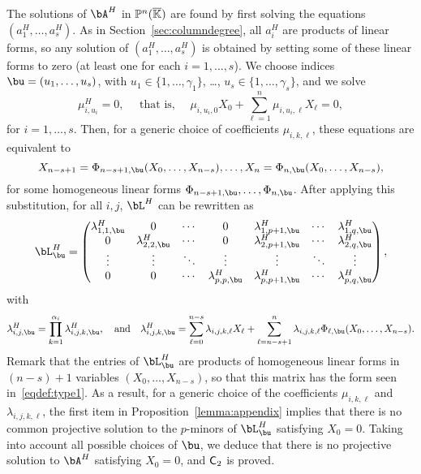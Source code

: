 \documentclass[12pt]{article}
\begin{document}
The solutions of $\bA^H$ in $\mathbb{P}^n(\overline{\mathbb{K}})$ are found by first solving
the equations $(a^H_1,\dots,a^H_s)$. As in Section~\ref{sec:columndegree}, all
$a_i^H$ are products of linear forms, so any solution of
$(a^H_1,\dots,a^H_s)$ is obtained by setting some of these linear forms
to zero (at least one for each $i=1,\dots,s$). We choose indices $\bu=(u_1,\dots,u_s)$, with
$u_1\in\{1,\dots,\gamma_1\}$, \dots, $u_s\in\{1,\dots,\gamma_s\}$, and
we solve
$$\mu^H_{i,u_i}=0, \quad \text{~that is,~} \quad \mu_{i,u_i,0}X_0 + \sum_{\ell = 1}^{n}\mu_{i,u_i,\ell}X_\ell =0,$$ for $i=1,\dots,s$.
Then, for a generic choice of coefficients $\mu_{i,k,\ell}$, these equations
are equivalent to
$$X_{n-s+1}=\Phi_{n-s+1,\bu}(X_0,\dots,X_{n-s}),\dots,X_{n}=\Phi_{n,\bu}(X_0,\dots,X_{n-s}),$$
for some homogeneous linear forms $\Phi_{n-s+1,\bu},\dots,\Phi_{n,\bu}$.
After applying this substitution, for all $i,j$,
$\bL^H$ can be rewritten as 
\begin{align*}
 \bL^H_\bu = \left( \begin{matrix}
\lambda^H_{1,1,\bu} & 0 & \cdots & 0 & \lambda^H_{1,p+1,\bu} & \cdots & \lambda^H_{1, q,\bu}\\
0 & \lambda^H_{2,2,\bu} & \cdots & 0 & \lambda^H_{2,p+1,\bu} & \cdots & \lambda^H_{2, q,\bu}\\
\vdots & \vdots & \ddots & \vdots & \vdots & \ddots & \vdots\\
0 & 0 & \cdots & \lambda^H_{p,p,\bu} & \lambda^H_{p,p+1,\bu} & \cdots & \lambda^H_{p, q,\bu}
\end{matrix} \right),
\end{align*}
with
$$\lambda^H_{i,j,\bu}=\prod_{k=1}^{\alpha_i}\lambda^H_{i,j,k,\bu},
\quad\text{and}\quad \lambda^H_{i,j,k,\bu}=\sum_{\ell =
  0}^{n-s}\lambda_{i,j,k,\ell}X_\ell + \sum_{\ell =
  n-s+1}^{n}\lambda_{i,j,k,\ell} \Phi_{\ell,\bu}(X_0,\dots,X_{n-s}).$$
Remark that the entries of $\bL^H_\bu$ are products of homogeneous
linear forms in $(n-s)+1$ variables $(X_0,\dots,X_{n-s})$, so that
this matrix has the form seen in~\eqref{eqdef:type1}. As a result, for
a generic choice of the coefficients $\mu_{i,k,\ell}$ and
$\lambda_{i,j,k,\ell}$, the first item in
Proposition~\ref{lemma:appendix} implies that there is no common projective
solution to the $p$-minors of 
$\bL^H_\bu$ satisfying $X_0=0$. Taking into account
all possible choices of $\bu$, we deduce that there is no projective
solution to $\bA^H$ satisfying $X_0=0$, and $\mathsf{C}_2$ is proved.
\end{document}
